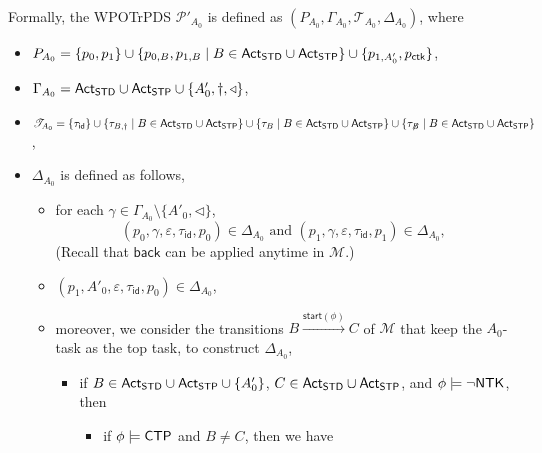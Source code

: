 \documentclass[preprint,12pt]{elsarticle}
\newcommand\Mm{{\mathcal{M} }}
\newcommand\Pp{{\mathcal{P} }}
\newcommand\act{{\sf Act}}
\newcommand\standard{{\sf STD}}
\newcommand\singletop{{\sf STP}}
\newcommand\ntkflag{{\sf NTK}}
\newcommand\ctpflag{{\sf CTP}}
\newcommand\back{{\mathsf{back} }}
\newcommand\startactivity{{\mathsf{start} }}
\newcommand{\id}{\mathsf{id}}
\newcommand\TranSet{{\mathscr{T} }}
\newcommand{\WOTrPDS}{\textsf{WPOTrPDS}}
\begin{document}
Formally, the {\WOTrPDS} $\Pp'_{A_0}$ is defined as $(P_{A_0}, \Gamma_{A_0}, \TranSet_{A_0}, \Delta_{A_0})$, where 
\begin{itemize}
\item $P_{A_0} = \{p_0, p_1\}\cup\{ p_{0, B}, p_{1, B} \mid B \in  \act_\standard \cup \act_\singletop\} \cup \{p_{1, A'_0}, p_{\sf ctk}\}$,
\item $\Gamma_{A_0} = \act_\standard \cup \act_\singletop \cup \{A'_0, \dag, \triangleleft\}$, 
\item $\TranSet_{A_0} = \{\tau_{\id} \}\cup \{\tau_{B, \dag} \mid B \in \act_\standard \cup \act_\singletop \} \cup \{\tau_{B} \mid B \in \act_\standard \cup \act_\singletop\}  \cup \{\tau_{\not B} \mid B \in \act_\standard \cup \act_\singletop\}$, 
\item $\Delta_{A_0}$ is defined as follows,
        \begin{itemize}
            \item for each $\gamma \in \Gamma_{A_0} \setminus \{A'_0, \triangleleft\}$, 
            $$(p_0, \gamma, \varepsilon, \tau_{\id}, p_0) \in \Delta_{A_0} \mbox{ and } (p_1, \gamma, \varepsilon, \tau_{\id}, p_1) \in \Delta_{A_0},$$ 
            (Recall that $\back$ can be applied anytime in $\Mm$.)
            \item $(p_1, A'_0, \varepsilon, \tau_{\id}, p_0) \in \Delta_{A_0}$,
	    \item moreover, we consider the transitions $B \xrightarrow{\startactivity(\phi)} C$ of $\Mm$ that keep the $A_0$-task as the top task, to construct $\Delta_{A_0}$, 
			\begin{itemize}
				\item if $B \in \act_\standard \cup \act_\singletop \cup \{A'_0\}$, $C \in \act_\standard \cup \act_\singletop$, and $\phi \models \neg \ntkflag$, then 
				\begin{itemize}
				\item if $\phi \models \ctpflag$ and $B \neq C$, then we have 

\end{itemize}
\end{itemize}
\end{itemize}
\end{itemize}
\end{document}
